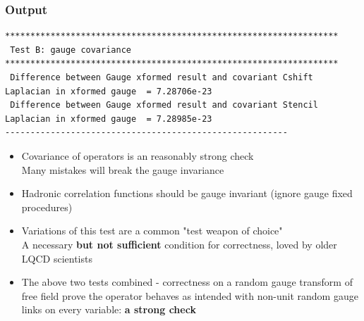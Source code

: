 \documentclass[pdf,ps,8pt]{beamer}
\begin{document}
\begin{frame}[fragile]\small\frametitle{Output}
{\tiny \begin{verbatim}
******************************************************************
 Test B: gauge covariance  
******************************************************************
 Difference between Gauge xformed result and covariant Cshift Laplacian in xformed gauge  = 7.28706e-23
 Difference between Gauge xformed result and covariant Stencil Laplacian in xformed gauge  = 7.28985e-23
--------------------------------------------------------
  \end{verbatim}
}
\begin{itemize}
\item Covariance of operators is an reasonably strong check \\
      Many mistakes will break the gauge invariance
\item Hadronic correlation functions should be gauge invariant (ignore gauge fixed procedures)
\item Variations of this test are a common "test weapon of choice"\\
      A necessary {\bf but not sufficient} condition for correctness, loved by older LQCD scientists
\item { \color{red} The above two tests combined - correctness on a random gauge transform of free field prove the operator behaves
        as intended with non-unit random gauge links on every variable: {\bf a strong check} }
\end{itemize}
\end{frame}
\end{document}
